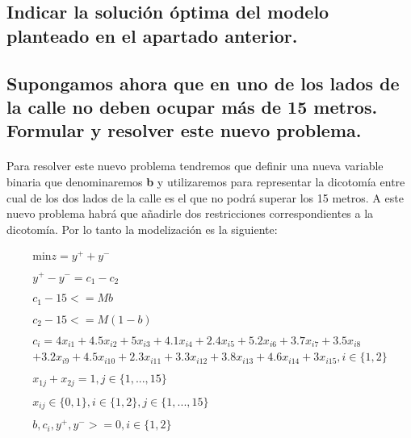 \documentclass[10pt, a4paper]{article}
\begin{document}
		\subsection{Indicar la solución óptima del modelo planteado en el apartado anterior.}

			\paragraph{}


		\subsection{Supongamos ahora que en uno de los lados de la calle no deben ocupar más de 15 metros. Formular y resolver este nuevo problema.}

			\paragraph{}
			Para resolver este nuevo problema tendremos que definir una nueva variable binaria que denominaremos \textbf{b} y utilizaremos para representar la dicotomía entre cual de los dos lados de la calle es el que no podrá superar los 15 metros. A este nuevo problema habrá que añadirle dos restricciones correspondientes a la dicotomía. Por lo tanto la modelización es la siguiente:

			\[
				\begin{split}
					\text{min} z = y^{+} + y^{-} \\ \\
						y^{+} - y^{-} = c_1 - c_2 \\ \\
						c_1 - 15 <= Mb \\ \\
						c_2 - 15 <= M(1-b) \\ \\
						c_i = 4x_{i1} + 4.5x_{i2} + 5x_{i3} + 4.1x_{i4} + 2.4x_{i5} + 5.2x_{i6} + 3.7x_{i7} + 3.5x_{i8} \\
						+ 3.2x_{i9} + 4.5x_{i10} + 2.3x_{i11} + 3.3x_{i12} + 3.8x_{i13} + 4.6x_{i14} + 3x_{i15}, i \in \{1,2\}\\ \\
						x_{1j} + x_{2j} = 1, j \in \{1,...,15\} \\ \\
						x_{ij} \in \{0,1\}, i \in \{1,2\},j \in \{1,...,15\} \\ \\
						b, c_{i}, y^{+}, y^{-} >= 0, i \in \{1,2\}\\ \\
				\end{split}
			\]
\end{document}
